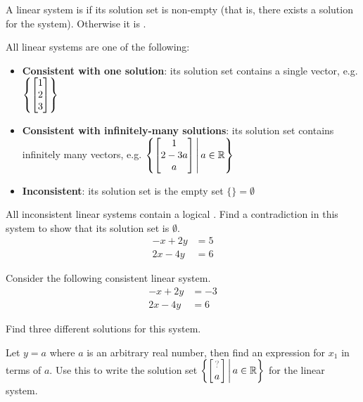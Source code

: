\begin{definition}
  A linear system is  if its solution set
  is non-empty (that is, there exists a solution for the
  system). Otherwise it is .
\end{definition}

\begin{fact}
  All linear systems are one of the following:
  \begin{itemize}
    \item \textbf{Consistent with one solution}:
          its solution set contains a single vector, e.g.
          \(\left\{\begin{bmatrix}1\\2\\3\end{bmatrix}\right\}\)
    \item \textbf{Consistent with infinitely-many solutions}:
          its solution set contains infinitely many vectors, e.g.
          \(
            \left\{
              \begin{bmatrix}1\\2-3a\\a\end{bmatrix}
            \,\middle|\,
              a\in\mathbb{R}
            \right\}
          \)
    \item \textbf{Inconsistent}:
          its solution set is the empty set \(\{\}=\emptyset\)
  \end{itemize}
\end{fact}

\begin{activity}{10}
  All inconsistent linear systems contain a logical .
  Find a contradiction in this system to show that its solution set
  is \(\emptyset\).
  \begin{align*}
  -x+2y  &=  5 \\
  2x-4y  &=  6
  \end{align*}
\end{activity}

\begin{activity}{10}
  Consider the following consistent linear system.
  \begin{align*}
  -x+2y  &= -3 \\
  2x-4y  &=  6
  \end{align*}
\begin{subactivity}
  Find three different solutions
  for this system.
\end{subactivity}
\begin{subactivity}
  Let \(y=a\) where \(a\) is an arbitrary real number, then find an
  expression for \(x_1\) in terms of \(a\). Use this to write
  the solution set
  \(
    \setBuilder
    {
    	\begin{bmatrix}
        \unknown \\
        a
      \end{bmatrix}
    }{
      a \in \IR
	  }
  \)
  for the linear system.
\end{subactivity}
\end{activity}

